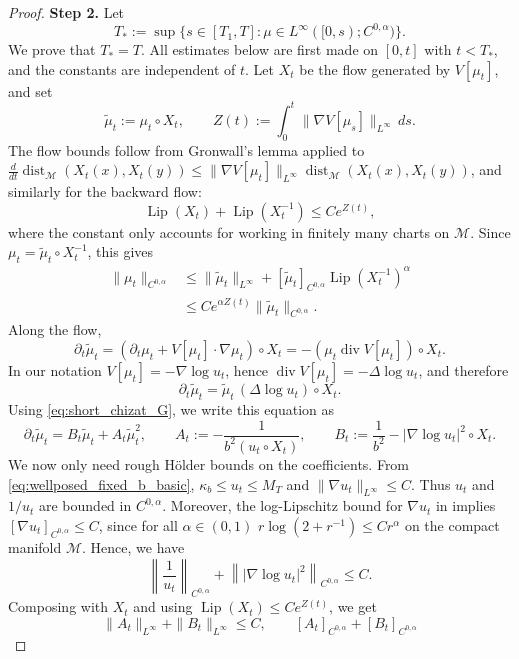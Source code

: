 \documentclass[10pt,a4paper]{amsart}
\def\M{\mathcal M}
\newcommand{\divg}{\operatorname{div}}
\begin{document}
\begin{proof}
\smallskip
\noindent\textbf{Step 2.}
Let
\[
T_\ast:=\sup\{s\in[T_1,T]:
\mu\in L^\infty([0,s);C^{0,\alpha})\}.
\]
We prove that \(T_\ast=T\).  All estimates below are first made on
\([0,t]\) with \(t<T_\ast\), and the constants are independent of \(t\).  Let
\(X_t\) be the flow generated by \(V[\mu_t]\), and set
\[
\tilde\mu_t:=\mu_t\circ X_t,\qquad
Z(t):=\int_0^t\|\nabla V[\mu_s]\|_{L^\infty}\,ds .
\]
The flow bounds follow from Gronwall's lemma applied to
\(\frac{d}{dt}\operatorname{dist}_{ \M}(X_t(x),X_t(y))\le
\|\nabla V[\mu_t]\|_{L^\infty}\operatorname{dist}_{ \M}(X_t(x),X_t(y))\), and similarly for the
backward flow:
\[
\operatorname{Lip}(X_t)+\operatorname{Lip}(X_t^{-1})\le C e^{Z(t)},
\]
where the constant only accounts for working in finitely many charts on
 \(\M\). Since \(\mu_t=\tilde\mu_t\circ X_t^{-1}\), this gives
\[
\begin{aligned}
\|\mu_t\|_{C^{0,\alpha}}
&\le \|\tilde\mu_t\|_{L^\infty}
+[\tilde\mu_t]_{C^{0,\alpha}}\operatorname{Lip}(X_t^{-1})^\alpha  \\
&\le C e^{\alpha Z(t)}\|\tilde\mu_t\|_{C^{0,\alpha}} .
\end{aligned}
\]
Along the flow,
\[
\partial_t\tilde\mu_t
=\left(\partial_t\mu_t+V[\mu_t]\cdot\nabla\mu_t\right)\circ X_t
=-\left(\mu_t\divg V[\mu_t]\right)\circ X_t .
\] 
In our
notation \(V[\mu_t]=-\nabla\log u_t\), hence
\(\divg V[\mu_t]=-\Delta\log u_t\), and therefore
\[
\partial_t\tilde\mu_t=\tilde\mu_t\,(\Delta\log u_t)\circ X_t .
\]
Using \eqref{eq:short_chizat_G}, we write this equation as
\begin{equation}
\label{eq:wp_A_B}
\partial_t\tilde\mu_t
=B_t\tilde\mu_t+A_t\tilde\mu_t^2,
\qquad
A_t:=-\frac1{b^2(u_t\circ X_t)},\qquad
B_t:=\frac1{b^2}-|\nabla\log u_t|^2\circ X_t .
\end{equation}
We now only need rough Hölder bounds on the coefficients.  From
\eqref{eq:wellposed_fixed_b_basic}, \(\kappa_b\le u_t\le M_T\) and
\(\|\nabla u_t\|_{L^\infty}\le C\).  Thus \(u_t\) and \(1/u_t\) are bounded in
\(C^{0,\alpha}\).  Moreover, the log-Lipschitz bound for \(\nabla u_t\) in
 implies
\([\nabla u_t]_{C^{0,\alpha}}\le C\), since for all $\alpha \in (0,1)$
\(r\log(2+r^{-1})\le Cr^\alpha\) on the compact manifold
 \(\M\).  Hence, we have
\[
\left\|\frac1{u_t}\right\|_{C^{0,\alpha}}
+\left\||\nabla\log u_t|^2\right\|_{C^{0,\alpha}}
\le C .
\]
Composing with \(X_t\) and using \(\operatorname{Lip}(X_t)\le Ce^{Z(t)}\), we get
\[
\|A_t\|_{L^\infty}+\|B_t\|_{L^\infty}\le C,
\qquad
[A_t]_{C^{0,\alpha}}+[B_t]_{C^{0,\alpha}}
\]
\end{proof}
\end{document}
